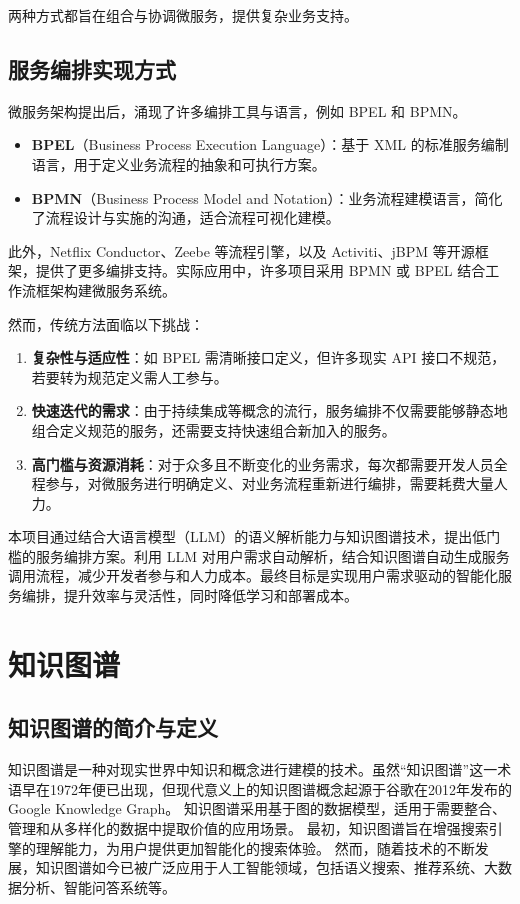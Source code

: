两种方式都旨在组合与协调微服务，提供复杂业务支持。

\subsection{服务编排实现方式}
微服务架构提出后，涌现了许多编排工具与语言，例如 BPEL 和 BPMN。
\begin{itemize}
    \item \textbf{BPEL}（Business Process Execution Language）：基于 XML 的标准服务编制语言，用于定义业务流程的抽象和可执行方案。
    \item \textbf{BPMN}（Business Process Model and Notation）：业务流程建模语言，简化了流程设计与实施的沟通，适合流程可视化建模。
\end{itemize}

此外，Netflix Conductor、Zeebe 等流程引擎，以及 Activiti、jBPM 等开源框架，提供了更多编排支持。实际应用中，许多项目采用 BPMN 或 BPEL 结合工作流框架构建微服务系统。

然而，传统方法面临以下挑战：
\begin{enumerate}
    \item \textbf{复杂性与适应性}：如 BPEL 需清晰接口定义，但许多现实 API 接口不规范，若要转为规范定义需人工参与。
    \item \textbf{快速迭代的需求}：由于持续集成等概念的流行，服务编排不仅需要能够静态地组合定义规范的服务，还需要支持快速组合新加入的服务。
    \item \textbf{高门槛与资源消耗}：对于众多且不断变化的业务需求，每次都需要开发人员全程参与，对微服务进行明确定义、对业务流程重新进行编排，需要耗费大量人力。
\end{enumerate}

本项目通过结合大语言模型（LLM）的语义解析能力与知识图谱技术，提出低门槛的服务编排方案。利用 LLM 对用户需求自动解析，结合知识图谱自动生成服务调用流程，减少开发者参与和人力成本。最终目标是实现用户需求驱动的智能化服务编排，提升效率与灵活性，同时降低学习和部署成本。

\section{知识图谱}

\subsection{知识图谱的简介与定义}

知识图谱是一种对现实世界中知识和概念进行建模的技术。虽然“知识图谱”这一术语早在1972年便已出现\cite{schneider1973course}，但现代意义上的知识图谱概念起源于谷歌在2012年发布的 Google Knowledge Graph\cite{singhal2012knowledge,zou2020survey}。
知识图谱采用基于图的数据模型，适用于需要整合、管理和从多样化的数据中提取价值的应用场景\cite{noy2019industry}。
最初，知识图谱旨在增强搜索引擎的理解能力，为用户提供更加智能化的搜索体验。
然而，随着技术的不断发展，知识图谱如今已被广泛应用于人工智能领域，包括语义搜索、推荐系统、大数据分析、智能问答系统等。

